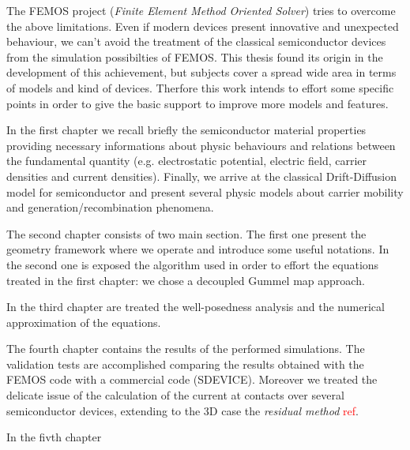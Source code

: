 The FEMOS project (\textit{Finite Element Method Oriented Solver}) tries to overcome the above limitations. 
Even if modern devices present innovative and unexpected behaviour, we can't avoid the treatment of the classical semiconductor devices from the simulation possibilties of FEMOS.
This thesis found its origin in the development of this achievement, but subjects cover a spread wide area in terms of models and kind of devices. Therfore this work intends to effort some specific points in order to give the basic support to improve more models and features. 

In the first chapter we recall briefly the semiconductor material properties providing necessary informations about physic behaviours and relations between the fundamental quantity (e.g. electrostatic potential, electric field, carrier densities and current densities). Finally, we arrive at the classical Drift-Diffusion model for semiconductor and present several physic models about carrier mobility and generation/recombination phenomena.

The second chapter consists of two main section. The first one present the geometry framework where we operate and introduce some useful notations. In the second one is exposed the algorithm used in order to effort the equations treated in the first chapter: we chose a decoupled Gummel map approach.

In the third chapter  are treated the well-posedness analysis and the numerical approximation of the equations.

The fourth chapter contains the results of the performed simulations. The validation tests are accomplished comparing the results obtained with the FEMOS code with a commercial code (SDEVICE). Moreover we treated the delicate issue of the calculation of the current at contacts over several semiconductor devices, extending to the 3D case the \textit{residual method} \textcolor{red}{ref}.

In the fivth chapter

